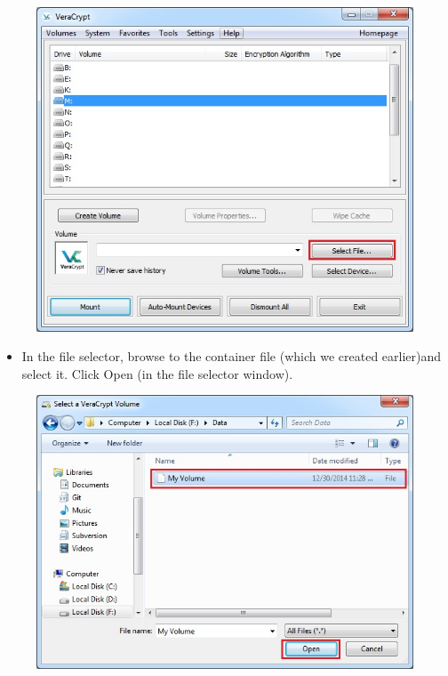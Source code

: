 \documentclass{tufte-handout}
\begin{document}
\begin{enumerate}
\begin{figure}
		\includegraphics[width=\linewidth]{img/vc_mount_2.png}
	\end{figure}
	\FloatBarrier	
	\begin{itemize}
		\item In the file selector, browse to the container file (which we created earlier)and select it. Click Open (in the file selector window).
	\end{itemize}
	\begin{figure}%
		\includegraphics[width=\linewidth]{img/vc_mount_3.png}
	\end{figure}
	\FloatBarrier
	\begin{itemize}

\end{itemize}
\end{enumerate}
\end{document}
